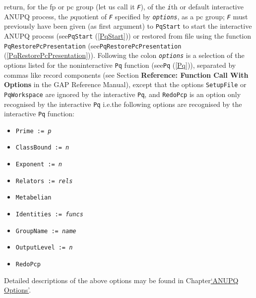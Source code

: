 \documentclass[a4paper,11pt]{report}
\begin{document}
{{{ return, for the fp or pc group (let us call it \mbox{\texttt{\mdseries\slshape F}}), of the \mbox{\texttt{\mdseries\slshape i}}th or default interactive \textsf{ANUPQ} process, the $p$\texttt{}quotient of \mbox{\texttt{\mdseries\slshape F}} specified by \mbox{\texttt{\mdseries\slshape options}}, as a pc group; \mbox{\texttt{\mdseries\slshape F}} must previously have been given (as first argument) to \texttt{PqStart} to start the interactive \textsf{ANUPQ} process (see{\nobreakspace}\texttt{PqStart} (\ref{PqStart})) or restored from file using the function \texttt{PqRestorePcPresentation} (see{\nobreakspace}\texttt{PqRestorePcPresentation} (\ref{PqRestorePcPresentation})). Following the colon \mbox{\texttt{\mdseries\slshape options}} is a selection of the options listed for the
non\texttt{}interactive \texttt{Pq} function (see{\nobreakspace}\texttt{Pq} (\ref{Pq})), separated by commas like record components (see Section{\nobreakspace} \textbf{Reference: Function Call With Options} in the \textsf{GAP} Reference Manual), except that the options \texttt{SetupFile} or \texttt{PqWorkspace} are ignored by the interactive \texttt{Pq}, and \texttt{RedoPcp} is an option only recognised by the interactive \texttt{Pq} i.e.{\nobreakspace}the following options are recognised by the interactive \texttt{Pq} function: 
\begin{itemize}
\item  \texttt{Prime := \mbox{\texttt{\mdseries\slshape p}}} 
\item  \texttt{ClassBound := \mbox{\texttt{\mdseries\slshape n}}} 
\item  \texttt{Exponent := \mbox{\texttt{\mdseries\slshape n}}} 
\item  \texttt{Relators := \mbox{\texttt{\mdseries\slshape rels}}} 
\item  \texttt{Metabelian} 
\item  \texttt{Identities := \mbox{\texttt{\mdseries\slshape funcs}}} 
\item  \texttt{GroupName := \mbox{\texttt{\mdseries\slshape name}}} 
\item  \texttt{OutputLevel := \mbox{\texttt{\mdseries\slshape n}}} 
\item  \texttt{RedoPcp} 
\end{itemize}
 Detailed descriptions of the above options may be found in
Chapter{\nobreakspace}\hyperref[ANUPQ Options]{`ANUPQ Options'}. 

}}}
\end{document}
